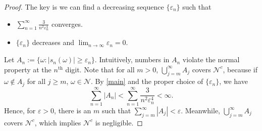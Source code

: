 \documentclass[12pt]{article}
\newcommand\nn{\mathcal{N}}
\newcommand\eps{\varepsilon}
\begin{document}
\begin{proof}
    The key is we can find a decreasing sequence $\{\eps_n\}$ such that 
    \begin{itemize}
        \item $\sum_{n = 1}^\infty \frac{3}{n^2\eps_n^4}$ converges. 
        \item $\{\eps_n\}$ decreases and $\lim_{n \to \infty} \eps_n= 0$.
    \end{itemize}
    Let $A_n := \{\omega : |s_n(\omega)| \geq \eps_n\}$.
    Intuitively, numbers in $A_n$ violate the normal property at the $n^{\text{th}}$ digit.
    Note that for all $m > 0$, $\bigcup_{j = m}^\infty A_j$ covers $\nn^c$, 
    because if $\omega \notin A_j$ for all $j \geq m$, $\omega \in \nn$.
    By \cref{main} and the proper choice of $\{\eps_n\}$, we have
    \begin{equation}
        \sum_{n=1}^\infty |A_n| < \sum_{n=1}^\infty \frac{3}{n^2\eps_n^4} < \infty.
    \end{equation}
    Hence, for $\eps > 0$, 
    there is an $m$ such that $\sum_{j = m}^\infty |A_j| < \eps$.
    Meanwhile, $\bigcup_{j = m}^\infty A_j$ covers $\nn^c$, 
    which implies $\nn^c$ is negligible.
\end{proof}
\end{document}
